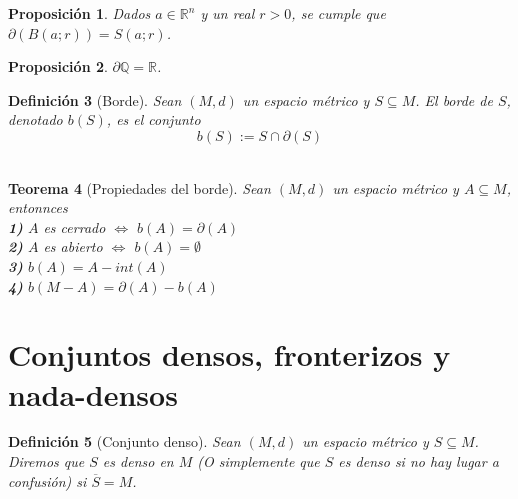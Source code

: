 \documentclass[oneside]{book} %
\theoremstyle{Teorema}
\newtheorem{Definicion}{Definición}[chapter]
\newtheorem{Teorema}[Definicion]{Teorema}
\newtheorem{Proposicion}[Definicion]{Proposición}
\theoremstyle{Ejemplos}
\theoremstyle{[Obs]}
\renewcommand{\{}{\left\lbrace} %
\renewcommand{\}}{\right\rbrace} %
\newcommand{\n}{\cap} %
\renewcommand{\sc}{\subseteq} %
\newcommand{\R}{\mathbb{R}} %
\newcommand{\Rn}{\mathbb{R}^n} %
\begin{document}
			\begin{Proposicion}
				
				Dados $a \in \Rn$ y un real $r > 0$, se cumple que $\partial (B(a;r)) = S(a;r)$. \\

			\end{Proposicion}

			\begin{Proposicion}
				
				$\partial \mathbb{Q} = \R$. \\

			\end{Proposicion}

			\begin{Definicion}[Borde]
				
				Sean $(M, d)$ un espacio métrico y $S \sc M$. El borde de $S$, denotado $b(S)$, es el conjunto \\
				
				\[ b(S) := S \n \partial(S) \] \\

			\end{Definicion}

			\begin{Teorema}[Propiedades del borde]
				
				Sean $(M, d)$ un espacio métrico y $A \sc M$, entonnces \\

				\textbf{1)} $A$ es cerrado $\Leftrightarrow$ $b(A) = \partial(A)$ \\

				\textbf{2)} $A$ es abierto $\Leftrightarrow$ $b(A) = \emptyset$ \\

				\textbf{3)} $b(A) = A - int(A)$ \\

				\textbf{4)} $b(M - A) = \partial(A) - b(A)$ \\

			\end{Teorema}

		\section{Conjuntos densos, fronterizos y nada-densos}

			\begin{Definicion}[Conjunto denso]
				
				Sean $(M, d)$ un espacio métrico y $S \sc M$. Diremos que $S$ es denso en $M$ (O simplemente que $S$ es denso si no hay lugar a confusión) si $\overline{S} = M$. \\

			\end{Definicion}
\end{document}
